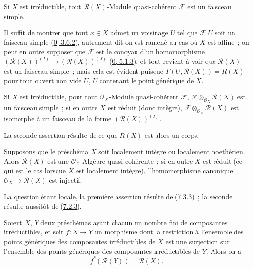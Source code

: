\begin{corollary}[7.3.5]
\label{I.7.3.5-fr}
Si $X$ est irréductible, tout $\mathscr{R}(X)$-Module quasi-cohérent
$\mathscr{F}$ est un faisceau simple.
\end{corollary}

Il suffit de montrer que tout $x\in X$ admet un voisinage $U$ tel que
$\mathscr{F}|U$ soit un faisceau simple
(\hyperref[0.3.6.2-fr]{0, 3.6.2}), autrement dit on est ramené au cas où $X$
est affine~; on peut en outre supposer que $\mathscr{F}$ est le conoyau d'un
homomorphisme
$(\mathscr{R}(X))^{(I)}\to(\mathscr{R}(X))^{(J)}$
(\hyperref[0.5.1.3-fr]{0, 5.1.3}), et tout revient à voir que
$\mathscr{R}(X)$ est un faisceau simple~; mais cela est évident puisque
$\Gamma(U,\mathscr{R}(X))=R(X)$ pour tout ouvert non vide $U$, $U$ contenant
le point générique de $X$.

\begin{corollary}[7.3.6]
\label{I.7.3.6-fr}
Si $X$ est irréductible, pour tout $\mathscr{O}_X$-Module quasi-cohérent
$\mathscr{F}$, $\mathscr{F}\otimes_{\mathscr{O}_X}\mathscr{R}(X)$ est un
faisceau simple~; si en outre $X$ est réduit (donc intègre),
$\mathscr{F}\otimes_{\mathscr{O}_X}\mathscr{R}(X)$ est isomorphe à un
faisceau de la forme $(\mathscr{R}(X))^{(I)}$.
\end{corollary}

La seconde assertion résulte de ce que $R(X)$ est alors un corps.

\begin{proposition}[7.3.7]
\label{I.7.3.7-fr}
Supposons que le préschéma $X$ soit localement intègre ou localement
noethérien. Alors $\mathscr{R}(X)$ est une $\mathscr{O}_X$-Algèbre
quasi-cohérente~; si en outre $X$ est réduit (ce qui est le cas lorsque $X$
est localement intègre), l'homomorphisme canonique
$\mathscr{O}_X\to\mathscr{R}(X)$ est injectif.
\end{proposition}

La question étant locale, la première assertion résulte de
(\hyperref[I.7.3.3-fr]{7.3.3})~; la seconde résulte aussitôt de
(\hyperref[I.7.2.3-fr]{7.2.3}).

\begin{env}[7.3.8]
\label{I.7.3.8-fr}
Soient $X$, $Y$ deux préschémas ayant chacun un nombre fini de composantes
irréductibles, et soit $f:X\to Y$ un morphisme dont la restriction à
l'ensemble des points génériques des composantes irréductibles de $X$ est une
surjection sur l'ensemble des points génériques des composantes irréductibles
de $Y$. Alors on a
\[
  f^*(\mathscr{R}(Y))=\mathscr{R}(X).
  \tag{7.3.8.1}\label{I.7.3.8.1-fr}
\]
\end{env}

